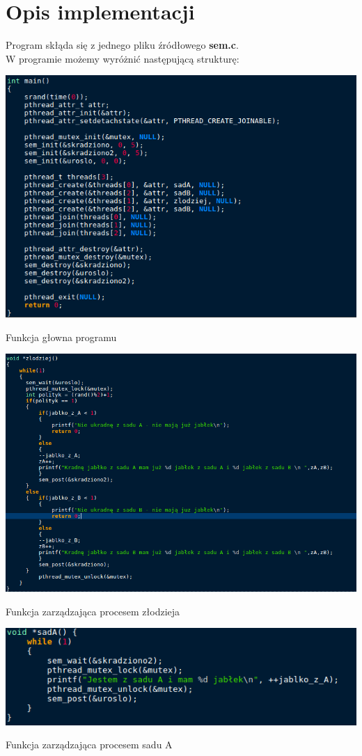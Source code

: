 \documentclass{article}
\begin{document}
\section{Opis implementacji}
Program skłąda się z jednego pliku źródłowego \textbf{sem.c}.\\ W programie możemy wyróżnić następującą strukturę:
\begin{center}
\includegraphics[width=\textwidth]{main} 
\caption{Funkcja głowna programu}
\end{center}

\begin{center}
\includegraphics[width=\textwidth]{zlodziej} 
\caption{Funkcja zarządzająca procesem złodzieja}
\end{center}

\begin{center}
\includegraphics[width=\textwidth]{sadA} 
\caption{Funkcja zarządzająca procesem sadu A}
\end{center}
\end{document}
